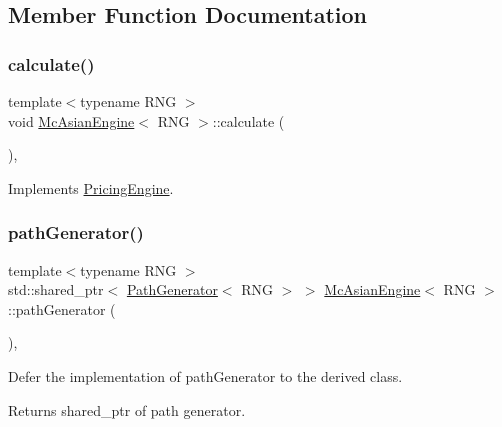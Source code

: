 \subsection{Member Function Documentation}
\hypertarget{class_mc_asian_engine_ac16f4259846f55dc6c02d0b628f34e63}{}\label{class_mc_asian_engine_ac16f4259846f55dc6c02d0b628f34e63} 
\subsubsection{\texorpdfstring{calculate()}{calculate()}}
{\footnotesize\ttfamily template$<$typename R\+NG $>$ \\
void \hyperlink{class_mc_asian_engine}{Mc\+Asian\+Engine}$<$ R\+NG $>$\+::calculate (\begin{DoxyParamCaption}{ }\end{DoxyParamCaption})\hspace{0.3cm}{\ttfamily [override]}, {\ttfamily [virtual]}}



Implements \hyperlink{class_pricing_engine_a733511ffc3cf5e4dc1fbc2a39208d8bd}{Pricing\+Engine}.

\hypertarget{class_mc_asian_engine_ae38592c71ae4d5d09c9eb13d7cc0c5ff}{}\label{class_mc_asian_engine_ae38592c71ae4d5d09c9eb13d7cc0c5ff} 
\subsubsection{\texorpdfstring{path\+Generator()}{pathGenerator()}}
{\footnotesize\ttfamily template$<$typename R\+NG $>$ \\
std\+::shared\+\_\+ptr$<$ \hyperlink{class_path_generator}{Path\+Generator}$<$ R\+NG $>$ $>$ \hyperlink{class_mc_asian_engine}{Mc\+Asian\+Engine}$<$ R\+NG $>$\+::path\+Generator (\begin{DoxyParamCaption}{ }\end{DoxyParamCaption})\hspace{0.3cm}{\ttfamily [override]}, {\ttfamily [virtual]}}



Defer the implementation of path\+Generator to the derived class. 

\begin{DoxyReturn}{Returns}
shared\+\_\+ptr of path generator. 
\end{DoxyReturn}


